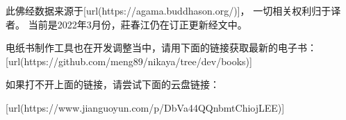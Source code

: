 此佛经数据来源于[url(https://agama.buddhason.org/)]， 一切相关权利归于译者。
当前是2022年3月份，莊春江仍在订正更新经文中。
\blank

电纸书制作工具也在开发调整当中，请用下面的链接获取最新的电子书：
[url(https://github.com/meng89/nikaya/tree/dev/books)]

\blank
如果打不开上面的链接，请尝试下面的云盘链接：

[url(https://www.jianguoyun.com/p/DbVa44QQnbmtChiojLEE)]